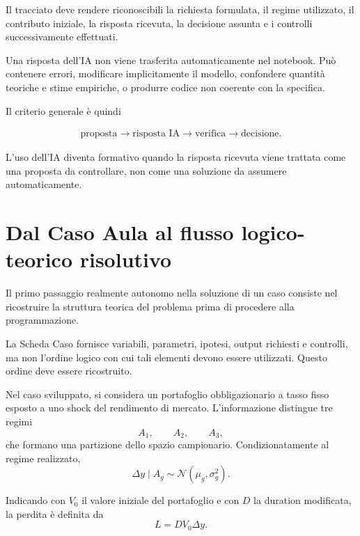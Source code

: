 Il tracciato deve rendere riconoscibili la richiesta formulata, il regime
utilizzato, il contributo iniziale, la risposta ricevuta, la decisione assunta
e i controlli successivamente effettuati.

Una risposta dell'IA non viene trasferita automaticamente nel notebook. Pu\`{o}
contenere errori, modificare implicitamente il modello, confondere quantit\`{a}
teoriche e stime empiriche, o produrre codice non coerente con la
specifica.

Il criterio generale \`{e} quindi

\vspace{-0.2cm}

\[
\begin{array}{c}
\text{proposta}
\rightarrow
\text{risposta IA}
\rightarrow
\text{verifica}
\rightarrow
\text{decisione}.
\end{array}
\]

L'uso dell'IA diventa formativo quando la risposta ricevuta viene trattata
come una proposta da controllare, non come una soluzione da assumere
automaticamente.


\section{Dal Caso Aula al flusso logico-teorico risolutivo}

Il primo passaggio realmente autonomo nella soluzione di un caso consiste nel
ricostruire la struttura teorica del problema prima di procedere alla
programmazione.

La Scheda Caso fornisce variabili, parametri, ipotesi, output richiesti e
controlli, ma non l'ordine logico con cui tali elementi devono essere
utilizzati. Questo ordine deve essere ricostruito.

Nel caso sviluppato, si considera un portafoglio obbligazionario a tasso fisso
esposto a uno shock del rendimento di mercato. L'informazione distingue tre
regimi
\[
A_{1},\qquad A_{2},\qquad A_{3},
\]
che formano una partizione dello spazio campionario. Condizionatamente al
regime realizzato,
\[
\Delta y\mid A_{g}
\sim
\mathcal{N}(\mu_{g},\sigma_{g}^{2}).
\]

Indicando con $V_{0}$ il valore iniziale del portafoglio e con $D$ la duration
modificata, la perdita \`{e} definita da
\[
L=D V_{0}\Delta y.
\]

